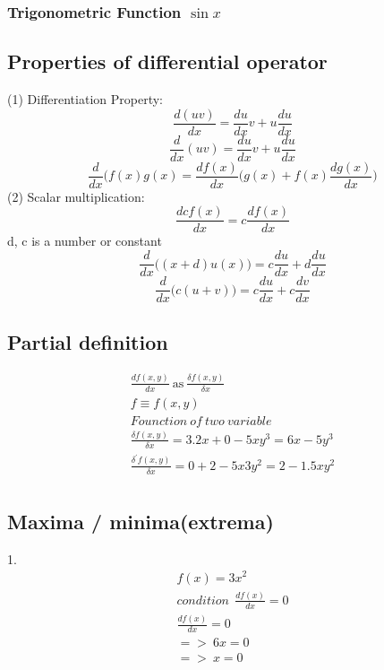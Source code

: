 		\subsubsection{Trigonometric Function $\sin x$}
		
		
		
		
		
		
	\subsection{Properties of differential operator}
	(1) Differentiation Property:
	\begin{equation}
		\frac{d(uv)}{dx} = \frac{du}{dx}v+u\frac{du}{dx}
	\end{equation}
	\begin{equation}
		\frac{d}{dx}(uv)=\frac{du}{dx}v+u\frac{du}{dx}
	\end{equation}
	\begin{equation}
		\frac{d}{dx}(f(x)g(x)=\frac{df(x)}{dx}\bigg(g(x)+f(x)\frac{dg(x)}{dx}\bigg)
	\end{equation}
	\newline
	(2) Scalar multiplication:
	\begin{equation}
		\frac{dcf(x)}{dx} = c\frac{df(x)}{dx}
	\end{equation}
		d, c is a number or constant
	\begin{equation}
		\frac{d}{dx}\Big((x+d)u(x)\Big)=c\frac{du}{dx}+d\frac{du}{dx}
	\end{equation}
	\begin{equation}
		\frac{d}{dx}\Big(c(u+v)\Big) = c\frac{du}{dx} + c\frac{dv}{dx}
	\end{equation}


	\subsection{Partial definition}
	\begin{align}
		\frac{d f(x,y)}{d x}  \ \text{as} \ \frac{\delta f(x,y)}{\delta x} \\
		f \equiv f(x,y) \\
		Founction \ of \ two \ variable \\
		\frac{\delta f (x,y)}{\delta x} = 3.2x+0-5xy^3=6x-5y^3 \\
		\frac{\delta^\prime f (x,y)}{\delta x} = 0+2-5x3y^2 = 2 - 1.5xy^2 \\
	\end{align}
	
	\subsection{Maxima / minima(extrema)}
	1.
	\begin{align}
		f(x) = 3x^2 \\
		condition \ \ \frac{d f (x)}{dx} = 0 \\
		\frac{df(x)}{dx} = 0\\
		=> \ 6x = 0 \\
		=> \ x = 0
	\end{align}
	
